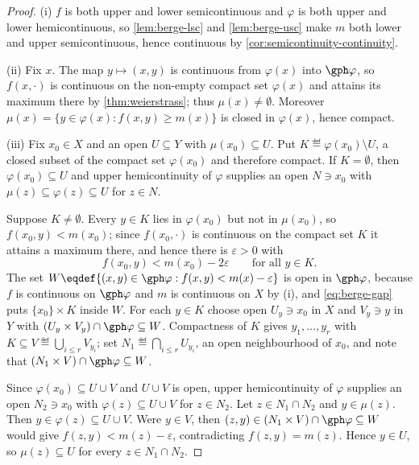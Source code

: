 \begin{proof}
	(i) $f$ is both upper and lower semicontinuous and $\varphi$ is both upper and
	lower hemicontinuous, so \autoref{lem:berge-lsc} and \autoref{lem:berge-usc}
	make $m$ both lower and upper semicontinuous, hence continuous by
	\autoref{cor:semicontinuity-continuity}.

	(ii) Fix $x$. The map $y\mapsto(x,y)$ is continuous from $\varphi(x)$ into
	$\gph\varphi$, so $f(x,\cdot)$ is continuous on the non-empty compact set
	$\varphi(x)$ and attains its maximum there by \autoref{thm:weierstrass}; thus
	$\mu(x)\neq\emptyset$. Moreover $\mu(x)=\{y\in\varphi(x) : f(x,y)\geq m(x)\}$
	is closed in $\varphi(x)$, hence compact.

	(iii) Fix $x_0\in X$ and an open $U\subseteq Y$ with $\mu(x_0)\subseteq U$. Put
	$K\eqdef\varphi(x_0)\setminus U$, a closed subset of the compact set
	$\varphi(x_0)$ and therefore compact. If $K=\emptyset$, then
	$\varphi(x_0)\subseteq U$ and upper hemicontinuity of $\varphi$ supplies an open
	$N\ni x_0$ with $\mu(z)\subseteq\varphi(z)\subseteq U$ for $z\in N$.

	Suppose $K\neq\emptyset$. Every $y\in K$ lies in $\varphi(x_0)$ but not in
	$\mu(x_0)$, so $f(x_0,y)<m(x_0)$; since $f(x_0,\cdot)$ is continuous on the
	compact set $K$ it attains a maximum there, and hence there is
	$\varepsilon>0$ with
	\begin{equation}\label{eq:berge-gap}
		f(x_0,y)<m(x_0)-2\varepsilon\qquad\text{for all }y\in K .
	\end{equation}
	The set $W\eqdef\{(x,y)\in\gph\varphi : f(x,y)<m(x)-\varepsilon\}$ is open in
	$\gph\varphi$, because $f$ is continuous on $\gph\varphi$ and $m$ is continuous
	on $X$ by (i), and \eqref{eq:berge-gap} puts $\{x_0\}\times K$ inside $W$. For
	each $y\in K$ choose open $U_y\ni x_0$ in $X$ and $V_y\ni y$ in $Y$ with
	$(U_y\times V_y)\cap\gph\varphi\subseteq W$. Compactness of $K$ gives
	$y_1,\dots,y_r$ with $K\subseteq V\eqdef\bigcup_{i\leq r}V_{y_i}$; set
	$N_1\eqdef\bigcap_{i\leq r}U_{y_i}$, an open neighbourhood of $x_0$, and note
	that $(N_1\times V)\cap\gph\varphi\subseteq W$.

	Since $\varphi(x_0)\subseteq U\cup V$ and $U\cup V$ is open, upper
	hemicontinuity of $\varphi$ supplies an open $N_2\ni x_0$ with
	$\varphi(z)\subseteq U\cup V$ for $z\in N_2$. Let $z\in N_1\cap N_2$ and
	$y\in\mu(z)$. Then $y\in\varphi(z)\subseteq U\cup V$. Were $y\in V$, then
	$(z,y)\in(N_1\times V)\cap\gph\varphi\subseteq W$ would give
	$f(z,y)<m(z)-\varepsilon$, contradicting $f(z,y)=m(z)$. Hence $y\in U$, so
	$\mu(z)\subseteq U$ for every $z\in N_1\cap N_2$.
\end{proof}

